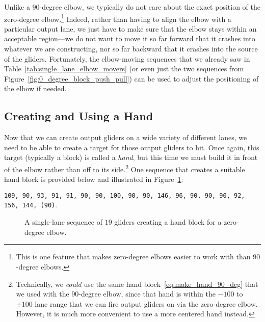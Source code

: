 Unlike a $90$-degree elbow, we typically do not care about the exact position of the zero-degree elbow.\footnote{This is one feature that makes zero-degree elbows easier to work with than $90$-degree elbows.} Indeed, rather than having to align the elbow with a particular output lane, we just have to make sure that the elbow stays within an acceptable region---we do not want to move it so far forward that it crashes into whatever we are constructing, nor so far backward that it crashes into the source of the gliders. Fortunately, the elbow-moving sequences that we already saw in Table~\ref{tab:single_lane_elbow_movers} (or even just the two sequences from Figure~\ref{fig:0_degree_block_push_pull}) can be used to adjust the positioning of the elbow if needed.


\subsection{Creating and Using a Hand}\label{sec:single_channel_zero_make_hand}

Now that we can create output gliders on a wide variety of different lanes, we need to be able to create a target for those output gliders to hit. Once again, this target (typically a block) is called a \emph{hand}, but this time we must build it in front of the elbow rather than off to its side.\footnote{Technically, we \emph{could} use the same hand block~\eqref{eq:make_hand_90_deg} that we used with the $90$-degree elbow, since that hand is within the $-100$ to $+100$ lane range that we can fire output gliders on via the zero-degree elbow. However, it is much more convenient to use a more centered hand instead.} One sequence that creates a suitable hand block is provided below and illustrated in Figure~\ref{fig:0degree_hand}:
\begin{center}
	\texttt{\small 109, 90, 93, 91, 91, 90, 90, 100, 90, 90, 146, 96, 90, 90, 90, 92, 156, 144, {\color{gray}(90)}}.
\end{center}

\begin{figure}[!htb]
	\centering
	\caption{A single-lane sequence of $19$ gliders creating a hand block for a zero-degree elbow.}\label{fig:0degree_hand}
\end{figure}

